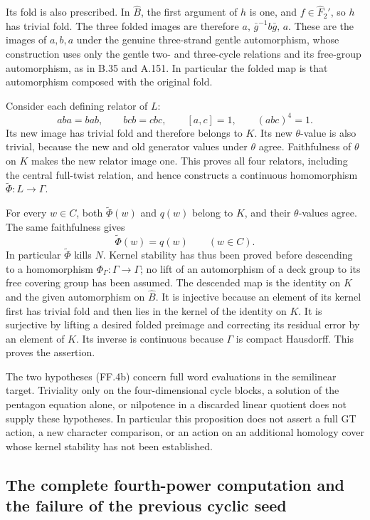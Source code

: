 Its fold is also prescribed. In $\widehat B$, the first
argument of $h$ is one, and $f\in\widehat F_2'$, so $h$
has trivial fold. The three folded images are therefore
$a,\,\bar g^{-1}b\bar g,\,a$. These are the images of
$a,b,a$ under the genuine three-strand gentle automorphism,
whose construction uses only the gentle two- and three-cycle
relations and its free-group automorphism, as in B.35 and
A.151. In particular the folded map is that automorphism
composed with the original fold.

Consider each defining relator of $L$:
\[
             aba=bab,\qquad bcb=cbc,\qquad
             [a,c]=1,\qquad (abc)^4=1.
\]
Its new image has trivial fold and therefore belongs to $K$.
Its new $\theta$-value is also trivial, because the new and
old generator values under $\theta$ agree. Faithfulness of
$\theta$ on $K$ makes the new relator image one. This proves
all four relators, including the central full-twist relation,
and hence constructs a continuous homomorphism
$\widetilde\Phi:L\to\Gamma$.

For every $w\in C$, both $\widetilde\Phi(w)$ and $q(w)$
belong to $K$, and their $\theta$-values agree. The same
faithfulness gives
\[
                         \widetilde\Phi(w)=q(w)
                                  \qquad(w\in C).
 \tag{FF.4d}
\]
In particular $\widetilde\Phi$ kills $N$. Kernel stability
has thus been proved before descending to a homomorphism
$\Phi_\Gamma:\Gamma\to\Gamma$; no lift of an automorphism
of a deck group to its free covering group has been assumed.
The descended map is the identity on $K$ and the given
automorphism on $\widehat B$. It is injective because an
element of its kernel first has trivial fold and then lies
in the kernel of the identity on $K$. It is surjective by
lifting a desired folded preimage and correcting its residual
error by an element of $K$. Its inverse is continuous because
$\Gamma$ is compact Hausdorff. This proves the assertion.

The two hypotheses (FF.4b) concern full word evaluations in
the semilinear target. Triviality only on the four-dimensional
cycle blocks, a solution of the pentagon equation alone, or
nilpotence in a discarded linear quotient does not supply
these hypotheses. In particular this proposition does not
assert a full GT action, a new character comparison, or an
action on an additional homology cover whose kernel stability
has not been established.

\subsection{The complete fourth-power computation and the failure of the previous cyclic seed}


